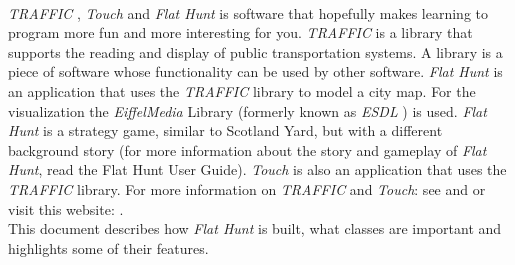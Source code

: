 \paragraph{}
\emph{TRAFFIC} \cite{dgsa05}, \emph{Touch} \cite{dgrk05} and \emph{Flat Hunt} is software that hopefully makes learning to program more fun and more interesting for you. \emph{TRAFFIC} is a library that supports the reading and display of public transportation systems. A library is a piece of software whose functionality can be used by other software. \emph{Flat Hunt} is an application that uses the \emph{TRAFFIC} library to model a city map. For the visualization the \emph{EiffelMedia} Library (formerly known as \emph{ESDL} \cite{dgtgb03}\cite{dgbb04}) is used. \emph{Flat Hunt} is a strategy game, similar to Scotland Yard, but with a different background story (for more information about the story and gameplay of \emph{Flat Hunt}, read the Flat Hunt User Guide). \emph{Touch} is also an application that uses the \emph{TRAFFIC} library. For more information on \emph{TRAFFIC} and \emph{Touch}: see \cite{dgsa05} and \cite{dgrk05} or visit this website: .\\

  This document describes how \emph{Flat Hunt} is built, what classes are important and highlights some of their features.

\pagebreak
